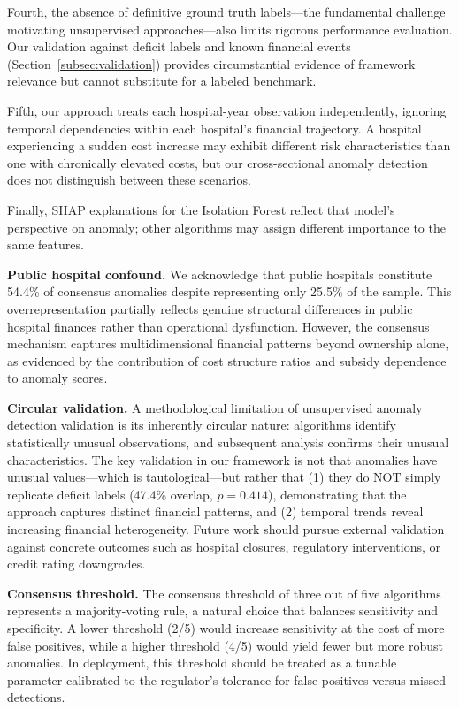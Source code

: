 \documentclass{ieeeaccess}
\begin{document}
Fourth, the absence of definitive ground truth labels---the fundamental challenge motivating unsupervised approaches---also limits rigorous performance evaluation. Our validation against deficit labels and known financial events (Section~\ref{subsec:validation}) provides circumstantial evidence of framework relevance but cannot substitute for a labeled benchmark.

Fifth, our approach treats each hospital-year observation independently, ignoring temporal dependencies within each hospital's financial trajectory. A hospital experiencing a sudden cost increase may exhibit different risk characteristics than one with chronically elevated costs, but our cross-sectional anomaly detection does not distinguish between these scenarios.

Finally, SHAP explanations for the Isolation Forest reflect that model's perspective on anomaly; other algorithms may assign different importance to the same features.

\textbf{Public hospital confound.} We acknowledge that public hospitals constitute 54.4\% of consensus anomalies despite representing only 25.5\% of the sample. This overrepresentation partially reflects genuine structural differences in public hospital finances rather than operational dysfunction. However, the consensus mechanism captures multidimensional financial patterns beyond ownership alone, as evidenced by the contribution of cost structure ratios and subsidy dependence to anomaly scores.

\textbf{Circular validation.} A methodological limitation of unsupervised anomaly detection validation is its inherently circular nature: algorithms identify statistically unusual observations, and subsequent analysis confirms their unusual characteristics. The key validation in our framework is not that anomalies have unusual values---which is tautological---but rather that (1) they do NOT simply replicate deficit labels (47.4\% overlap, $p=0.414$), demonstrating that the approach captures distinct financial patterns, and (2) temporal trends reveal increasing financial heterogeneity. Future work should pursue external validation against concrete outcomes such as hospital closures, regulatory interventions, or credit rating downgrades.

\textbf{Consensus threshold.} The consensus threshold of three out of five algorithms represents a majority-voting rule, a natural choice that balances sensitivity and specificity. A lower threshold (2/5) would increase sensitivity at the cost of more false positives, while a higher threshold (4/5) would yield fewer but more robust anomalies. In deployment, this threshold should be treated as a tunable parameter calibrated to the regulator's tolerance for false positives versus missed detections.
\end{document}

